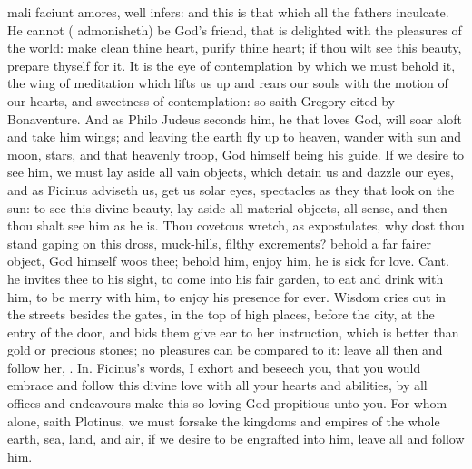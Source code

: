 {{mali faciunt amores}, \Austin{} well infers: and this is that which all the
fathers inculcate. He cannot (\Austin{} admonisheth) be God's
friend, that is delighted with the pleasures of the world: make clean
thine heart, purify thine heart; if thou wilt see this beauty, prepare
thyself for it. It is the eye of contemplation by which we must behold
it, the wing of meditation which lifts us up and rears our souls with
the motion of our hearts, and sweetness of contemplation: so saith
Gregory cited by Bonaventure. And as Philo Judeus seconds
him, he that loves God, will soar aloft and take him wings; and leaving
the earth fly up to heaven, wander with sun and moon, stars, and that
heavenly troop, God himself being his guide. If we desire to see him,
we must lay aside all vain objects, which detain us and dazzle our
eyes, and as Ficinus adviseth us, get us solar eyes, spectacles
as they that look on the sun: to see this divine beauty, lay aside all
material objects, all sense, and then thou shalt see him as he is. Thou
covetous wretch, as \Austin{} expostulates, why dost thou stand
gaping on this dross, muck-hills, filthy excrements? behold a far
fairer object, God himself woos thee; behold him, enjoy him, he is sick
for love. Cant.  he invites thee to his sight, to come into his fair
garden, to eat and drink with him, to be merry with him, to enjoy his
presence for ever. Wisdom cries out in the streets besides the
gates, in the top of high places, before the city, at the entry of the
door, and bids them give ear to her instruction, which is better than
gold or precious stones; no pleasures can be compared to it: leave all
then and follow her, . In.
Ficinus's words, I exhort and beseech you, that you would embrace
and follow this divine love with all your hearts and abilities, by all
offices and endeavours make this so loving God propitious unto you. For
whom alone, saith Plotinus, we must forsake the kingdoms and
empires of the whole earth, sea, land, and air, if we desire to be
engrafted into him, leave all and follow him.

}

